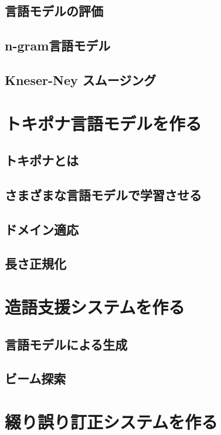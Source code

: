 \documentclass[11pt]{report}
\begin{document}
\section{言語モデルの評価}

\section{n-gram言語モデル}

\section{Kneser-Ney スムージング}

\chapter{トキポナ言語モデルを作る}

\section{トキポナとは}

\section{さまざまな言語モデルで学習させる}

\section{ドメイン適応}

\section{長さ正規化}

\chapter{造語支援システムを作る}

\section{言語モデルによる生成}

\section{ビーム探索}

\chapter{綴り誤り訂正システムを作る}
\end{document}
